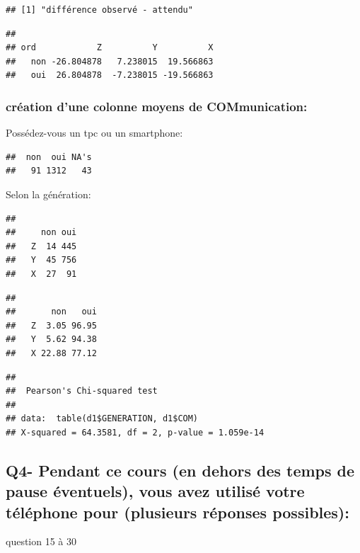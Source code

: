 \documentclass[]{article}
\begin{document}
\begin{verbatim}
## [1] "différence observé - attendu"
\end{verbatim}

\begin{verbatim}
##      
## ord            Z          Y          X
##   non -26.804878   7.238015  19.566863
##   oui  26.804878  -7.238015 -19.566863
\end{verbatim}

\subsubsection{création d'une colonne moyens de
COMmunication:}\label{creation-dune-colonne-moyens-de-communication}

Possédez-vous un tpc ou un smartphone:

\begin{verbatim}
##  non  oui NA's 
##   91 1312   43
\end{verbatim}

Selon la génération:

\begin{verbatim}
##    
##     non oui
##   Z  14 445
##   Y  45 756
##   X  27  91
\end{verbatim}

\begin{verbatim}
##    
##       non   oui
##   Z  3.05 96.95
##   Y  5.62 94.38
##   X 22.88 77.12
\end{verbatim}

\begin{verbatim}
## 
##  Pearson's Chi-squared test
## 
## data:  table(d1$GENERATION, d1$COM)
## X-squared = 64.3581, df = 2, p-value = 1.059e-14
\end{verbatim}

\subsection{Q4- Pendant ce cours (en dehors des temps de pause
éventuels), vous avez utilisé votre téléphone pour (plusieurs réponses
possibles):}\label{q4--pendant-ce-cours-en-dehors-des-temps-de-pause-eventuels-vous-avez-utilise-votre-telephone-pour-plusieurs-reponses-possibles}

question 15 à 30
\end{document}
